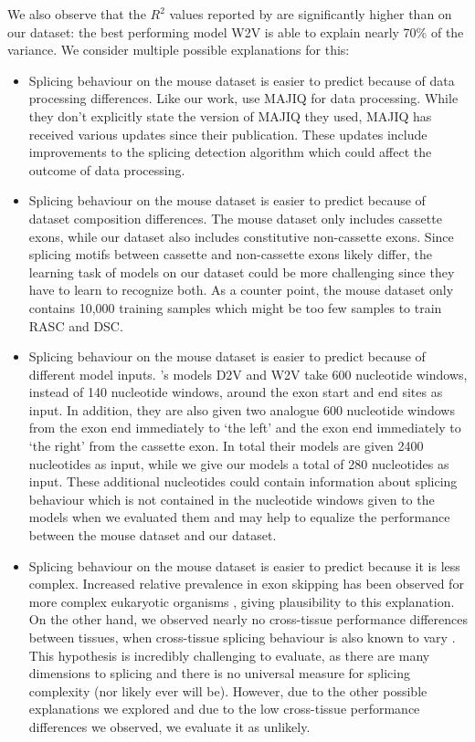 We also observe that the $R^2$ values reported by \cite{d2vsplicing} are significantly higher than on our dataset: the best performing model W2V is able to explain nearly 70\% of the variance. We consider multiple possible explanations for this: 
\begin{itemize}
	\item Splicing behaviour on the mouse dataset is easier to predict because of data processing differences. Like our work, \cite{d2vsplicing} use MAJIQ for data processing. While they don't explicitly state the version of MAJIQ they used, MAJIQ has received various updates since their publication. These updates include improvements to the splicing detection algorithm which could affect the outcome of data processing. 
	\item Splicing behaviour on the mouse dataset is easier to predict because of dataset composition differences. The mouse dataset only includes cassette exons, while our dataset also includes constitutive non-cassette exons. Since splicing motifs between cassette and non-cassette exons likely differ, the learning task of models on our dataset could be more challenging since they have to learn to recognize both. As a counter point, the mouse dataset only contains 10,000 training samples which might be too few samples to train RASC and DSC.

	

	\item Splicing behaviour on the mouse dataset is easier to predict because of different model inputs. \cite{d2vsplicing}'s models D2V and W2V take 600 nucleotide windows, instead of 140 nucleotide windows, around the exon start and end sites as input. In addition, they are also given two analogue 600 nucleotide windows from the exon end immediately to `the left' and the exon end immediately to `the right' from the cassette exon. In total their models are given 2400 nucleotides as input, while we give our models a total of 280 nucleotides as input. These additional nucleotides could contain information about splicing behaviour which is not contained in the nucleotide windows given to the models when we evaluated them and may help to equalize the performance between the mouse dataset and our dataset. 
	\item Splicing behaviour on the mouse dataset is easier to predict because it is less complex. Increased relative prevalence in exon skipping has been observed for more complex eukaryotic organisms \cite{splicing_current_perspectives}, giving plausibility to this explanation. On the other hand, we observed nearly no cross-tissue performance differences between tissues, when cross-tissue splicing behaviour is also known to vary \cite{crosstissuesplicing}. This hypothesis is incredibly challenging to evaluate, as there are many dimensions to splicing and there is no universal measure for splicing complexity (nor likely ever will be). However, due to the other possible explanations we explored and due to the low cross-tissue performance differences we observed, we evaluate it as unlikely.
	

\end{itemize}
